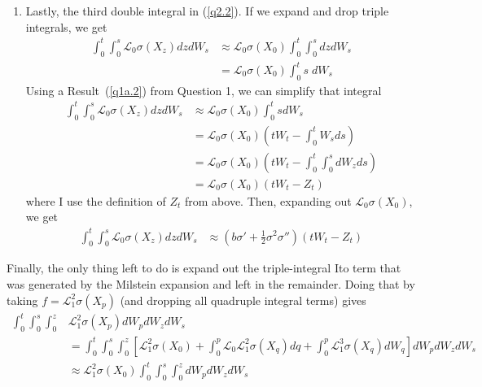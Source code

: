 \documentclass[12pt]{article}
\theoremstyle{plain}
\theoremstyle{definition}
\theoremstyle{remark}
\begin{document}
\begin{enumerate}
\begin{enumerate}
      \item Lastly, the third double integral in (\ref{q2.2}). If we
        expand and drop triple integrals, we get
        \begin{align*}
          \int^t_0 \int^s_0 \mathscr{L}_0 \sigma(X_z) dz dW_s
          &\approx
          \mathscr{L}_0 \sigma(X_0) \int^t_0 \int^s_0  dz dW_s\\
          &=
          \mathscr{L}_0 \sigma(X_0) \int^t_0 s \;dW_s
        \end{align*}
        Using a Result~(\ref{q1a.2}) from Question 1, we can simplify
        that integral
        \begin{align*}
          \int^t_0 \int^s_0 \mathscr{L}_0 \sigma(X_z) dz dW_s
          &\approx
          \mathscr{L}_0 \sigma(X_0) \int^t_0 s dW_s \\
          &=
          \mathscr{L}_0\sigma(X_0)\left(tW_t - \int^t_0 W_s ds\right)\\
          &=
          \mathscr{L}_0\sigma(X_0)
          \left(tW_t - \int^t_0 \int^s_0 dW_z ds\right)\\
          &=
          \mathscr{L}_0\sigma(X_0)\left(tW_t - Z_t\right)
        \end{align*}
        where I use the definition of $Z_t$ from above. Then, expanding
        out $\mathscr{L}_0\sigma(X_0)$, we get
        \begin{align*}
          \int^t_0 \int^s_0 \mathscr{L}_0 \sigma(X_z) dz dW_s
          &\approx
          \left(b\sigma' + \frac{1}{2}\sigma^2\sigma''\right)
          \left(tW_t - Z_t\right)
        \end{align*}
    \end{enumerate}
    Finally, the only thing left to do is expand out the triple-integral
    Ito term that was generated by the Milstein expansion and left in
    the remainder. Doing that by taking $f=\mathscr{L}_1^2\sigma(X_p)$
    (and dropping all quadruple integral terms) gives
    \begin{align*}
        \int^t_0\int^s_0 \int^z_0
          &\mathscr{L}^2_1\sigma(X_p) dW_p dW_z dW_s\\
      &=
        \int^t_0\int^s_0 \int^z_0
        \left[
          \mathscr{L}^2_1\sigma(X_0)
          +\int^p_0 \mathscr{L}_0 \mathscr{L}^2_1\sigma(X_q) dq
          +\int^p_0 \mathscr{L}^3_1\sigma(X_q) dW_q
        \right]
        dW_p dW_z dW_s\\
      &\approx
        \mathscr{L}^2_1\sigma(X_0) \int^t_0\int^s_0 \int^z_0 dW_p dW_z dW_s
    \end{align*}

\end{enumerate}
\end{document}
